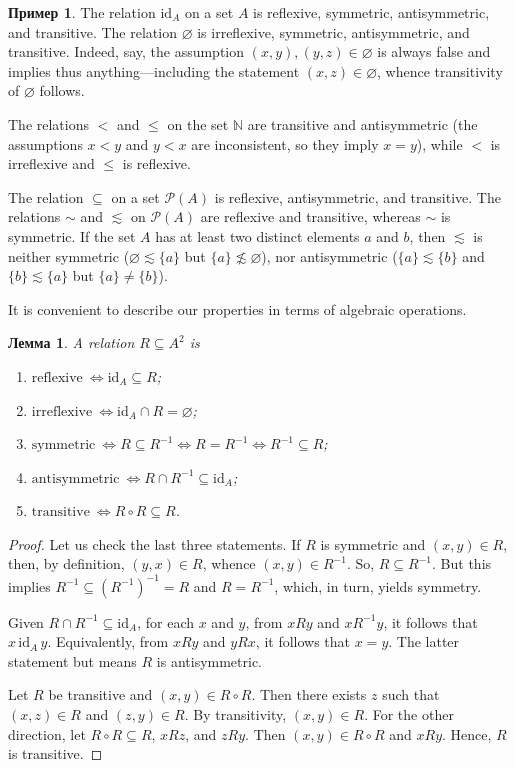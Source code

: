 \documentclass[12pt,notitlepage]{article}
\theoremstyle{plain}
\newtheorem{lemma}[thm]{Лемма}
\theoremstyle{definition}
\newtheorem{exm}[thm]{Пример}
\theoremstyle{plain}
\newcommand{\N}{\mathbb{N}}
\newcommand{\sbs}{\subseteq}
\newcommand{\void}{\varnothing}
\newcommand{\mP}{\mathcal{P}}
\newcommand{\id}{\mathrm{id}}
\newcommand{\1}{\mathbf{1}}
\newcommand{\0}{\mathbf{0}}
\begin{document}
\begin{exm}
	The relation $\id_A$ on a set $A$ is reflexive, symmetric, antisymmetric, and transitive. The relation $\void$ is irreflexive, symmetric, antisymmetric, and transitive. Indeed, say, the assumption $(x,y), (y,z) \in \void$ is always false and implies thus anything---including the statement $(x,z) \in \void$, whence transitivity of $\void$ follows.
	
	
	The relations ${<}$ and ${\leq}$ on the set $\N$ are transitive and antisymmetric (the assumptions $x < y$ and $y < x$ are inconsistent, so they imply $x = y$), while ${<}$ is irreflexive and ${\leq}$ is reflexive.
	
	The relation ${\sbs}$ on a set $\mP(A)$ is reflexive, antisymmetric, and transitive. The relations ${\sim}$ and ${\lesssim}$ on $\mP(A)$ are reflexive and transitive, whereas ${\sim}$ is symmetric. If the set $A$ has at least two distinct elements $a$ and $b$, then ${\lesssim}$ is neither symmetric ($\void \lesssim \{a\}$ but $\{a\} \not\lesssim \void$), nor antisymmetric ($\{a\} \lesssim \{b\}$ and $\{b\} \lesssim \{a\}$ but $\{a\} \neq \{b\}$).
\end{exm}

\noindent It is convenient to describe our properties in terms of algebraic operations.
\begin{lemma}
	A relation $R \sbs A^2$ is
	\begin{enumerate}
		\item $\mbox{reflexive}\ \iff \id_A \sbs R$;
		\item $\mbox{irreflexive}\ \iff \id_A \cap R = \void$;
		\item $\mbox{symmetric}\ \iff R \sbs R^{-1} \iff R = R^{-1} \iff R^{-1} \sbs R$;
		\item $\mbox{antisymmetric}\ \iff R \cap R^{-1} \sbs \id_A$;
		\item $\mbox{transitive}\ \iff R \circ R \sbs R$.
	\end{enumerate}
\end{lemma}
\begin{proof}
	Let us check the last three statements. If $R$ is symmetric and $(x,y) \in R$, then, by definition, $(y,x) \in R$, whence $(x,y) \in R^{-1}$. So, $R \sbs R^{-1}$. But this implies $R^{-1} \sbs (R^{-1})^{-1} = R$ and $R = R^{-1}$, which, in turn, yields symmetry.
	
	Given $R \cap R^{-1} \sbs \id_A$, for each $x$ and $y$, from $xRy$ and $x R^{-1} y$, it follows that $x\, \id_A\, y$. Equivalently, from $xRy$ and $y R x$, it follows that $x = y$. The latter statement but means $R$ is antisymmetric.
	
	Let $R$ be transitive and $(x,y) \in R \circ R$. Then there exists $z$ such that $(x,z) \in R$ and $(z,y) \in R$. By transitivity, $(x,y) \in R$. For the other direction, let $R \circ R \sbs R$, $x R z$, and $z R y$. Then $(x,y) \in R \circ R$ and $x R y$. Hence, $R$ is transitive.
\end{proof}
\end{document}
